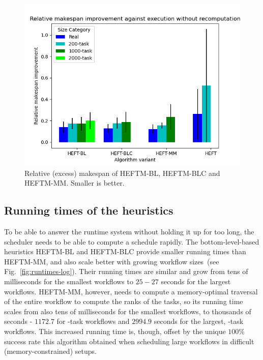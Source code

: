 \documentclass[conference]{IEEEtran}
\newcommand{\algo}[1]{\textsc{#1}}
\newcommand{\heftmm}{\algo{HEFTM-MM}\xspace}
\newcommand{\heftbl}{\algo{HEFTM-BL}\xspace}
\newcommand{\heftblc}{\algo{HEFTM-BLC}\xspace}
\begin{document}
    \begin{figure}[tb]
        \centering
        \includegraphics[width=0.95\columnwidth] {images/UpdatesMss2}
        \caption{Relative (excess) makespan of \heftbl, \heftblc and \heftmm. Smaller is better.}
        \label{fig:updates-ms}
        \vspace{-0.3cm}
    \end{figure}


\subsection{Running times of the heuristics}
\label{sec.expe.t}

    To be able to answer the runtime system without holding it up for too long, the scheduler needs to 
    be able to compute a schedule rapidly. %
    The bottom-level-based heuristics \heftbl and \heftblc provide smaller running times than \heftmm, 
    and also scale better with growing workflow
    sizes~(see Fig.~\ref{fig:runtimes-log}).
    Their running times are similar and grow from tens of milliseconds for the smallest workflows to $25-27$ seconds 
    for the largest workflows.
    \heftmm, however, needs to compute a memory-optimal traversal of the entire workflow to compute the ranks 
    of the tasks,
    so its running time scales from also tens of milliseconds for the smallest workflows, 
    to thousands of seconds - $1172.7$ for -task workflows and
    $2994.9$ seconds for the largest, -task workflows.
    This increased running time is, though, offset by the unique $100\%$ success rate this algorithm 
    obtained when scheduling large
    workflows in difficult (memory-constrained) setups.
    
\end{document}
